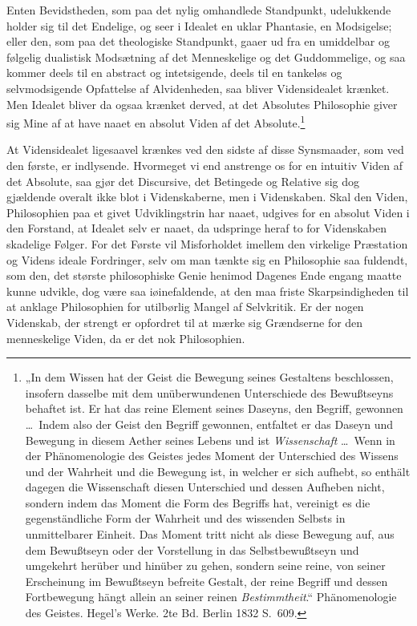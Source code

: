 \documentclass[12pt]{book}
\newcommand{\opage}[1]{\marginnote{\footnotesize\textit{[#1]}}}
\begin{document}
Enten Bevidstheden, som paa det nylig omhandlede Standpunkt, udelukkende holder sig til det
Endelige, og seer i Idealet en uklar Phantasie, en Modsigelse; eller den, som paa det theologiske
Standpunkt, gaaer ud fra en umiddelbar og følgelig dualistisk Modsætning af det Menneskelige og det
Guddommelige, og saa kommer deels til en abstract og intetsigende, deels til en tankeløs og
selvmodsigende Opfattelse af Alvidenheden, saa bliver Vidensidealet krænket. Men Idealet bliver da
ogsaa krænket derved, at det Absolutes Philosophie giver sig Mine af at have naaet en absolut Viden
af det Absolute.\footnote{„In dem Wissen hat der Geist die Bewegung seines Gestaltens beschlossen,
insofern dasselbe mit dem unüberwundenen Unterschiede des Bewußtseyns behaftet ist. Er hat das reine
Element seines Daseyns, den Begriff, gewonnen \dots\ Indem also der Geist den Begriff gewonnen,
entfaltet er das Daseyn und Bewegung in diesem Aether seines Lebens und ist \emph{Wissenschaft}
\dots\ Wenn in der Phänomenologie des Geistes jedes Moment der Unterschied des Wissens und der
Wahrheit und die Bewegung ist, in welcher er sich aufhebt, so enthält dagegen die Wissenschaft
diesen Unterschied und dessen Aufheben nicht, sondern indem das Moment die Form des Begriffs hat,
vereinigt es die gegenständliche Form der Wahrheit und des wissenden Selbsts in unmittelbarer
Einheit. Das Moment tritt nicht als diese Bewegung auf, aus dem Bewußtseyn oder der Vorstellung in
das Selbstbewußtseyn und umgekehrt herüber und hinüber zu gehen, sondern seine reine, von seiner
Erscheinung im Bewußtseyn befreite Gestalt, der reine Begriff und dessen Fortbewegung hängt allein
an seiner reinen \emph{Bestimmtheit}.“ Phänomenologie des Geistes. Hegel's Werke. 2te Bd. Berlin
1832 S.~609.}

\opage{252} At Vidensidealet ligesaavel krænkes ved den sidste af disse Synsmaader, som ved den første, er
indlysende. Hvormeget vi end anstrenge os for en intuitiv Viden af det Absolute, saa gjør det
Discursive, det Betingede og Relative sig dog gjældende overalt ikke blot i Videnskaberne, men i
Videnskaben. Skal den Viden, Philosophien paa et givet Udviklingstrin har naaet, udgives for en
absolut Viden i den Forstand, at Idealet selv er naaet, da udspringe heraf to for Videnskaben
skadelige Følger. For det Første vil Misforholdet imellem den virkelige Præstation og Videns ideale
Fordringer, selv om man tænkte sig en Philosophie saa fuldendt, som den, det største philosophiske
Genie henimod Dagenes Ende engang maatte kunne udvikle, dog være saa iøinefaldende, at den maa
friste Skarpsindigheden til at anklage Philosophien for utilbørlig Mangel af Selvkritik. Er der
nogen Videnskab, der strengt er opfordret til at mærke sig Grændserne for den menneskelige Viden, da
er det nok Philosophien.
\end{document}
